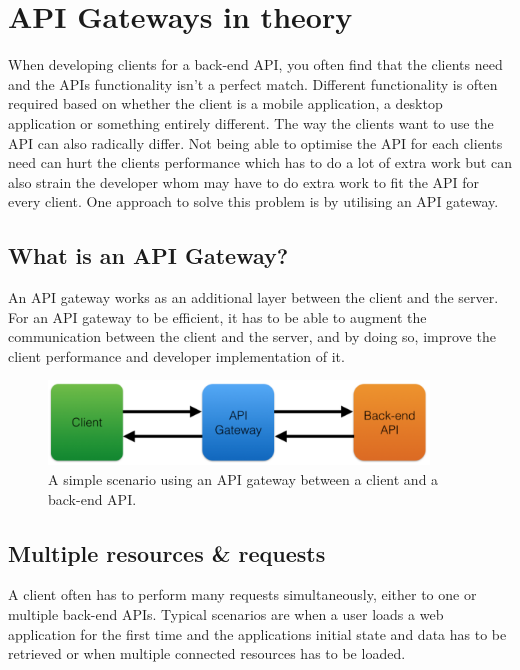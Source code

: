 \documentclass{cslthse-msc}
\begin{document}
\chapter{API Gateways in theory}
When developing clients for a back-end API, you often find that the clients need and the APIs functionality isn't a perfect match. Different functionality is often required based on whether the client is a mobile application, a desktop application or something entirely different. The way the clients want to use the API can also radically differ. Not being able to optimise the API for each clients need can hurt the clients performance which has to do a lot of extra work but can also strain the developer whom may have to do extra work to fit the API for every client. One approach to solve this problem is by utilising an API gateway.

\section{What is an API Gateway?}
An API gateway works as an additional layer between the client and the server. For an API gateway to be efficient, it has to be able to augment the communication between the client and the server, and by doing so, improve the client performance and developer implementation of it.

\begin{figure}[H]
  \centering
    \begin{center}
      \includegraphics[width=0.9\textwidth]{images/api_gateway.png}
    \end{center}
  \caption{A simple scenario using an API gateway between a client and a back-end API.}
\end{figure}

\section{Multiple resources \& requests}
A client often has to perform many requests simultaneously, either to one or multiple back-end APIs. Typical scenarios are when a user loads a web application for the first time and the applications initial state and data has to be retrieved or when multiple connected resources has to be loaded.
\end{document}

